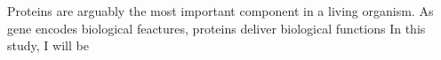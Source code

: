 Proteins are arguably the most important component in a living organism. As gene encodes biological feactures, proteins deliver biological functions   In this study, I will be 